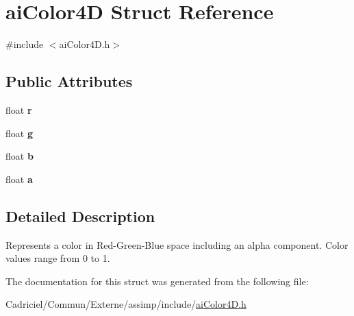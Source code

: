 \hypertarget{structai_color4_d}{\section{ai\-Color4\-D Struct Reference}
\label{structai_color4_d}
}


{\ttfamily \#include $<$ai\-Color4\-D.\-h$>$}

\subsection*{Public Attributes}
\begin{DoxyCompactItemize}
\item 
\hypertarget{structai_color4_d_a989c2117cfae5a4457fa65f0257e93c7}{float {\bfseries r}}\label{structai_color4_d_a989c2117cfae5a4457fa65f0257e93c7}

\item 
\hypertarget{structai_color4_d_a32e929c7db12fb6f79f74a611f6d8fe6}{float {\bfseries g}}\label{structai_color4_d_a32e929c7db12fb6f79f74a611f6d8fe6}

\item 
\hypertarget{structai_color4_d_ab64376fc730371f8952f5f98084b2430}{float {\bfseries b}}\label{structai_color4_d_ab64376fc730371f8952f5f98084b2430}

\item 
\hypertarget{structai_color4_d_a1bf4f719c14e844dcd7ce5a1c1969c89}{float {\bfseries a}}\label{structai_color4_d_a1bf4f719c14e844dcd7ce5a1c1969c89}

\end{DoxyCompactItemize}


\subsection{Detailed Description}
Represents a color in Red-\/\-Green-\/\-Blue space including an alpha component. Color values range from 0 to 1. 

The documentation for this struct was generated from the following file\-:\begin{DoxyCompactItemize}
\item 
Cadriciel/\-Commun/\-Externe/assimp/include/\hyperlink{ai_color4_d_8h}{ai\-Color4\-D.\-h}\end{DoxyCompactItemize}
